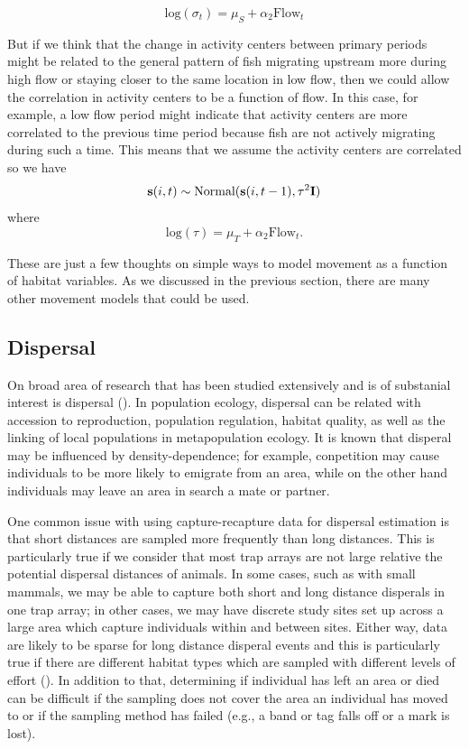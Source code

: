 \[
 \mbox{log}(\sigma_t) = \mu_S + \alpha_2 \mbox{Flow}_t
\]

But if we think that the change in activity centers between primary periods might be related to the 
general pattern of fish migrating upstream more during high flow or staying closer to the same location
in low flow, then we could allow the correlation in activity centers to be a function of flow.  In this
case, for example, a low flow period might indicate that activity centers are more correlated to the previous
time period because fish are not actively migrating during such a time.  
This means that we assume the
activity centers are correlated so we have
\[
{\bf s}(i,t) \sim \mbox{Normal}({\bf
  s}(i,t-1), \tau^{2} {\bf I})
\]
where
\[
\mbox{log}(\tau) = \mu_T + \alpha_2 \mbox{Flow}_t.
\]

These are just a few thoughts on simple ways to model movement as a
function of habitat variables. 
As we discussed in the previous section, there
are many other movement models that could be used.


\subsection{Dispersal}

On broad area of research that has been studied extensively and is of substanial interest is dispersal (\cite{clobert_etal:2001}).  In population ecology, dispersal can be related with accession to reproduction, 
population regulation, habitat quality, as well as the linking of local populations in metapopulation ecology.  It is known
that disperal may be influenced by density-dependence; for example, conpetition may cause individuals
to be more likely to emigrate from an area, while on the other hand individuals may leave an area in search 
a mate or partner.  


One common issue with using capture-recapture data for dispersal estimation is that short distances
are sampled more frequently than long distances.  This is particularly true if we consider that most
trap arrays are not large relative the potential dispersal distances of animals.   In some cases,
such as with small mammals, we may be able to capture both short and long distance disperals 
in one trap array; in other cases, we may have discrete study sites set up across a large area which
capture individuals within and between sites.  Either way, data are likely to be sparse for long distance
disperal events and this is particularly true if there are different habitat types which are sampled
with different levels of effort (\cite{ovaskainen_etal:2008}).  In addition to that, determining if individual 
has left an area or died can be difficult if the sampling does not cover the area an individual has 
moved to or if the sampling method has failed (e.g., a band or tag falls off or a mark is lost).  

